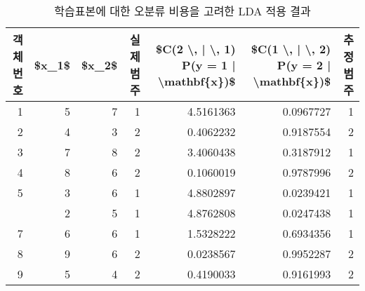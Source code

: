 \documentclass[
]{book}
\newenvironment{Shaded}{\begin{snugshade}}{\end{snugshade}}
\newcommand{\AttributeTok}[1]{\textcolor[rgb]{0.77,0.63,0.00}{#1}}
\newcommand{\ConstantTok}[1]{\textcolor[rgb]{0.00,0.00,0.00}{#1}}
\newcommand{\DecValTok}[1]{\textcolor[rgb]{0.00,0.00,0.81}{#1}}
\newcommand{\FunctionTok}[1]{\textcolor[rgb]{0.00,0.00,0.00}{#1}}
\newcommand{\NormalTok}[1]{#1}
\newcommand{\SpecialCharTok}[1]{\textcolor[rgb]{0.00,0.00,0.00}{#1}}
\newcommand{\StringTok}[1]{\textcolor[rgb]{0.31,0.60,0.02}{#1}}
\begin{document}
\begin{Shaded}
\end{Shaded}

\begin{table}

\caption{\label{tab:lda-unequal-cost-result}학습표본에 대한 오분류 비용을 고려한 LDA 적용 결과}
\centering
\begin{tabular}[t]{rrrrrrr}
\toprule
객체번호 & \$x\_1\$ & \$x\_2\$ & 실제범주 & \$C(2 \textbackslash{}, | \textbackslash{}, 1) P(y = 1 | \textbackslash{}mathbf\{x\})\$ & \$C(1 \textbackslash{}, | \textbackslash{}, 2) P(y = 2 | \textbackslash{}mathbf\{x\})\$ & 추정범주\\
\midrule
1 & 5 & 7 & 1 & 4.5161363 & 0.0967727 & 1\\
2 & 4 & 3 & 2 & 0.4062232 & 0.9187554 & 2\\
3 & 7 & 8 & 2 & 3.4060438 & 0.3187912 & 1\\
4 & 8 & 6 & 2 & 0.1060019 & 0.9787996 & 2\\
5 & 3 & 6 & 1 & 4.8802897 & 0.0239421 & 1\\
\addlinespace
6 & 2 & 5 & 1 & 4.8762808 & 0.0247438 & 1\\
7 & 6 & 6 & 1 & 1.5328222 & 0.6934356 & 1\\
8 & 9 & 6 & 2 & 0.0238567 & 0.9952287 & 2\\
9 & 5 & 4 & 2 & 0.4190033 & 0.9161993 & 2\\
\bottomrule
\end{tabular}
\end{table}
\end{document}
